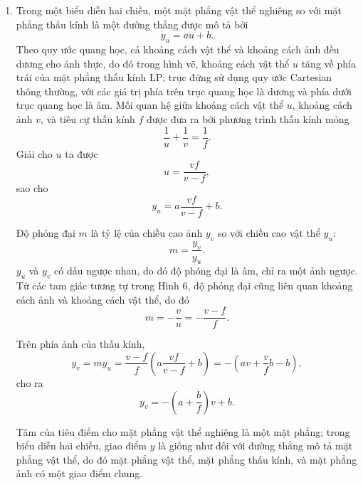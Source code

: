 \begin{enumerate}[label=(\alph*)]
\item Trong một biểu diễn hai chiều, một mặt phẳng vật thể nghiêng so với mặt phẳng thấu kính là một đường thẳng được mô tả bởi
\begin{equation}
y_u = au + b.    
\end{equation}
Theo quy ước quang học, cả khoảng cách vật thể và khoảng cách ảnh đều dương cho ảnh thực, do đó trong hình vẽ, khoảng cách vật thể $ u $ tăng về phía trái của mặt phẳng thấu kính LP; trục đứng sử dụng quy ước Cartesian thông thường, với các giá trị phía trên trục quang học là dương và phía dưới trục quang học là âm.
Mối quan hệ giữa khoảng cách vật thể $ u $, khoảng cách ảnh $ v $, và tiêu cự thấu kính $ f $ được đưa ra bởi phương trình thấu kính mỏng
\begin{equation}
\dfrac{1}{u} + \dfrac{1}{v} = \dfrac{1}{f}.
\end{equation}
Giải cho $ u $ ta được
\begin{equation}
u = \dfrac{vf}{v - f},
\end{equation}
sao cho
\begin{equation}
\label{eq:S2_01}
y_u = a \frac{vf}{v-f} + b.
\end{equation}

Độ phóng đại $ m $ là tỷ lệ của chiều cao ảnh $ y_v $ so với chiều cao vật thể $ y_u $:
\begin{equation}
m = \dfrac{y_v}{y_u}.
\end{equation}
$ y_u $ và $ y_v $ có dấu ngược nhau, do đó độ phóng đại là âm, chỉ ra một ảnh ngược. Từ các tam giác tương tự trong Hình 6, độ phóng đại cũng liên quan khoảng cách ảnh và khoảng cách vật thể, do đó
\begin{equation}
m = -\dfrac{v}{u} = -\dfrac{v-f}{f}.
\end{equation}

Trên phía ảnh của thấu kính,
\begin{equation}
y_v = my_u
= \dfrac{v-f}{f}\left(a \dfrac{vf}{v-f} + b\right)
= -\left(av + \dfrac{v}{f}b - b\right),
\end{equation}
cho ra
\begin{equation}
\label{eq:S2_02}  
y_v = -\left(a + \dfrac{b}{f}\right)v + b.
\end{equation}

Tâm của tiêu điểm cho mặt phẳng vật thể nghiêng là một mặt phẳng; trong biểu diễn hai chiều, giao điểm $ y $ là giống như đối với đường thẳng mô tả mặt phẳng vật thể, do đó mặt phẳng vật thể, mặt phẳng thấu kính, và mặt phẳng ảnh có một giao điểm chung.


\end{enumerate}
